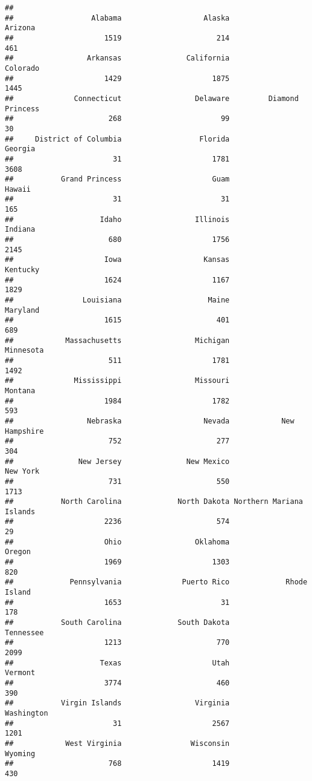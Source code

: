 \documentclass[]{article}
\begin{document}
\begin{verbatim}
## 
##                  Alabama                   Alaska                  Arizona 
##                     1519                      214                      461 
##                 Arkansas               California                 Colorado 
##                     1429                     1875                     1445 
##              Connecticut                 Delaware         Diamond Princess 
##                      268                       99                       30 
##     District of Columbia                  Florida                  Georgia 
##                       31                     1781                     3608 
##           Grand Princess                     Guam                   Hawaii 
##                       31                       31                      165 
##                    Idaho                 Illinois                  Indiana 
##                      680                     1756                     2145 
##                     Iowa                   Kansas                 Kentucky 
##                     1624                     1167                     1829 
##                Louisiana                    Maine                 Maryland 
##                     1615                      401                      689 
##            Massachusetts                 Michigan                Minnesota 
##                      511                     1781                     1492 
##              Mississippi                 Missouri                  Montana 
##                     1984                     1782                      593 
##                 Nebraska                   Nevada            New Hampshire 
##                      752                      277                      304 
##               New Jersey               New Mexico                 New York 
##                      731                      550                     1713 
##           North Carolina             North Dakota Northern Mariana Islands 
##                     2236                      574                       29 
##                     Ohio                 Oklahoma                   Oregon 
##                     1969                     1303                      820 
##             Pennsylvania              Puerto Rico             Rhode Island 
##                     1653                       31                      178 
##           South Carolina             South Dakota                Tennessee 
##                     1213                      770                     2099 
##                    Texas                     Utah                  Vermont 
##                     3774                      460                      390 
##           Virgin Islands                 Virginia               Washington 
##                       31                     2567                     1201 
##            West Virginia                Wisconsin                  Wyoming 
##                      768                     1419                      430
\end{verbatim}
\end{document}

